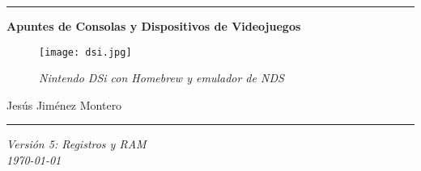 \documentclass[12pt]{article}
\date{}
\begin{document}
\nocite{atkinson}
\nocite{circuitverse}
\nocite{chatgpt}
\nocite{duke}
\nocite{texstudio}
\begin{titlepage}
        \begin{center}


        \hrule
        \vspace{1cm}
        \vspace{1cm}
        {\bfseries\huge Apuntes de Consolas y Dispositivos de Videojuegos \par}
        \vspace{2cm}

        \begin{figure}[H]
            \centering
            \texttt{[image: dsi.jpg]}
            \caption*{\footnotesize{\textit{Nintendo DSi con Homebrew y emulador de NDS}}}
            \label{fig:dsi}
        \end{figure}

        {\large
        Jesús Jiménez Montero \\
        \par}
        \vspace{1cm}
        \hrule
        \vspace{1cm}

        {\large
        \textit{Versión 5: Registros y RAM\\
        \today}
        \par}
        \end{center}
\end{titlepage}

\newpage
\renewcommand{\contentsname}{Tabla de contenidos}
\setcounter{secnumdepth}{5}
\tableofcontents
\setcounter{tocdepth}{4}

\newpage
\newpage
\renewcommand{\listfigurename}{Lista de figuras}
\thispagestyle{empty}
\listoffigures
\newpage

\renewcommand{\listtablename}{Lista de tablas}
\listoftables
\newpage


\end{document}

